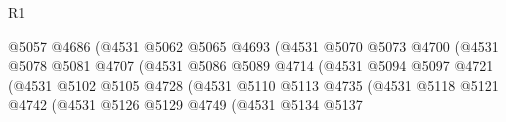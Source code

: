 \begin{lexlean}{R1}
\begin{coremodule}
                                                @5057
                                                @4686
                                                (@4531
                                                  @5062
                                                  @5065
                                                  @4693
                                                  (@4531
                                                    @5070
                                                    @5073
                                                    @4700
                                                    (@4531
                                                      @5078
                                                      @5081
                                                      @4707
                                                      (@4531
                                                        @5086
                                                        @5089
                                                        @4714
                                                        (@4531
                                                          @5094
                                                          @5097
                                                          @4721
                                                          (@4531
                                                            @5102
                                                            @5105
                                                            @4728
                                                            (@4531
                                                              @5110
                                                              @5113
                                                              @4735
                                                              (@4531
                                                                @5118
                                                                @5121
                                                                @4742
                                                                (@4531
                                                                  @5126
                                                                  @5129
                                                                  @4749
                                                                  (@4531
                                                                    @5134
                                                                    @5137

\end{coremodule}
\end{lexlean}
